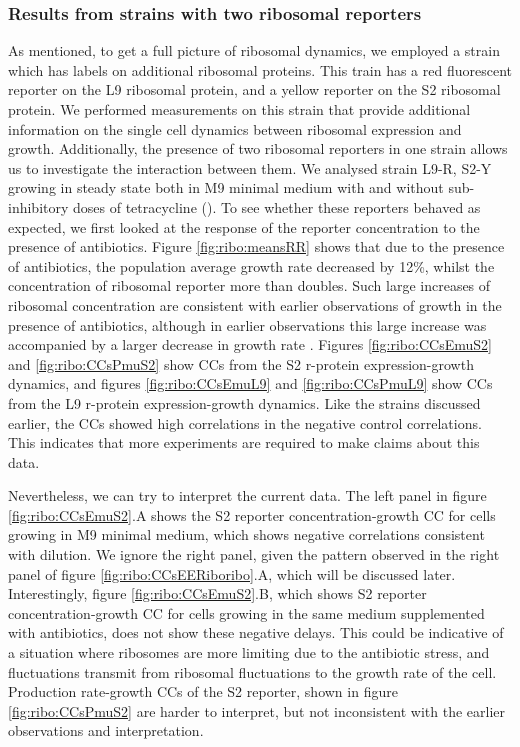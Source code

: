 \subsubsection{Results from strains with two ribosomal reporters}

As mentioned, to get a full picture of ribosomal dynamics, we employed a strain which has labels on additional ribosomal proteins. This train has a red fluorescent reporter on the L9 ribosomal protein, and a yellow reporter on the S2 ribosomal protein.
%
We performed measurements on this strain that provide additional information on the single cell dynamics between ribosomal expression and growth.
Additionally, the presence of two ribosomal reporters in one strain allows us to investigate the interaction between them.
%
We analysed strain L9-R, S2-Y 
growing in steady state both in M9 minimal medium with and without sub-inhibitory doses of tetracycline ().
%
To see whether these reporters behaved as expected, we first looked at the response of the reporter concentration to the presence of antibiotics.
Figure \ref{fig:ribo:meansRR} shows that due to the presence of antibiotics, the population average growth rate decreased by 12\%, whilst the concentration of ribosomal reporter more than doubles.
%
Such large increases of ribosomal concentration are consistent with earlier observations of growth in the presence of antibiotics, although in earlier observations this large increase was accompanied by a larger decrease in growth rate \cite{Hui2015}.
%
Figures \ref{fig:ribo:CCsEmuS2} and \ref{fig:ribo:CCsPmuS2} show CCs from the S2 r-protein expression-growth dynamics, and 
figures \ref{fig:ribo:CCsEmuL9} and \ref{fig:ribo:CCsPmuL9} show CCs from the L9 r-protein expression-growth dynamics.
%
Like the strains discussed earlier, the CCs showed high correlations in the negative control correlations.
This indicates that more experiments are required to make claims about this data.




Nevertheless, we can try to interpret the current data.
%
The left panel in figure \ref{fig:ribo:CCsEmuS2}.A shows the S2 reporter concentration-growth CC for cells growing in M9 minimal medium, which shows negative correlations consistent with dilution.
We ignore the right panel, given the pattern observed in the right panel of figure \ref{fig:ribo:CCsEERiboribo}.A, which will be discussed later.
%
Interestingly, figure \ref{fig:ribo:CCsEmuS2}.B, which shows S2 reporter concentration-growth CC for cells growing in the same medium supplemented with antibiotics, does not show these negative delays. 
This could be indicative of a situation where ribosomes are more limiting due to the antibiotic stress, and fluctuations transmit from ribosomal fluctuations to the growth rate of the cell.
%
Production rate-growth CCs of the S2 reporter, shown in figure \ref{fig:ribo:CCsPmuS2} are harder to interpret, but not inconsistent with the earlier observations and interpretation.


